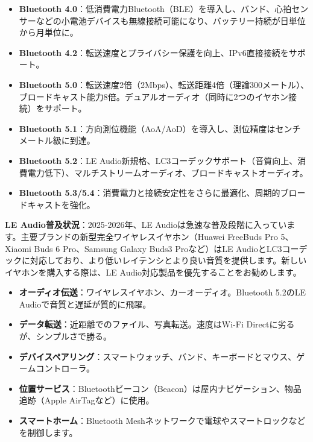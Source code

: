 
\begin{itemize}
  \item \textbf{Bluetooth 4.0}：低消費電力Bluetooth（BLE）を導入し、バンド、心拍センサーなどの小電池デバイスも無線接続可能になり、バッテリー持続が日単位から月単位に。
  \item \textbf{Bluetooth 4.2}：転送速度とプライバシー保護を向上、IPv6直接接続をサポート。
  \item \textbf{Bluetooth 5.0}：転送速度2倍（2Mbps）、転送距離4倍（理論300メートル）、ブロードキャスト能力8倍。デュアルオーディオ（同時に2つのイヤホン接続）をサポート。
  \item \textbf{Bluetooth 5.1}：方向測位機能（AoA/AoD）を導入し、測位精度はセンチメートル級に到達。
  \item \textbf{Bluetooth 5.2}：LE Audio新規格、LC3コーデックサポート（音質向上、消費電力低下）、マルチストリームオーディオ、ブロードキャストオーディオ。
  \item \textbf{Bluetooth 5.3/5.4}：消費電力と接続安定性をさらに最適化、周期的ブロードキャストを強化。
\end{itemize}

\textbf{LE Audio普及状況}：2025-2026年、LE Audioは急速な普及段階に入っています。主要ブランドの新型完全ワイヤレスイヤホン（Huawei FreeBuds Pro 5、Xiaomi Buds 6 Pro、Samsung Galaxy Buds3 Proなど）はLE AudioとLC3コーデックに対応しており、より低いレイテンシとより良い音質を提供します。新しいイヤホンを購入する際は、LE Audio対応製品を優先することをお勧めします。


\begin{itemize}
  \item \textbf{オーディオ伝送}：ワイヤレスイヤホン、カーオーディオ。Bluetooth 5.2のLE Audioで音質と遅延が質的に飛躍。
  \item \textbf{データ転送}：近距離でのファイル、写真転送。速度はWi-Fi Directに劣るが、シンプルさで勝る。
  \item \textbf{デバイスペアリング}：スマートウォッチ、バンド、キーボードとマウス、ゲームコントローラ。
  \item \textbf{位置サービス}：Bluetoothビーコン（Beacon）は屋内ナビゲーション、物品追跡（Apple AirTagなど）に使用。
  \item \textbf{スマートホーム}：Bluetooth Meshネットワークで電球やスマートロックなどを制御します。
\end{itemize}


